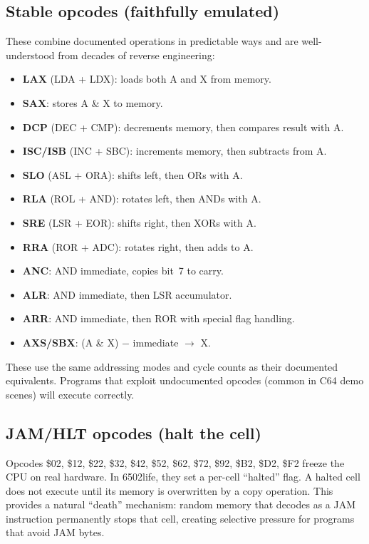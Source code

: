 \documentclass{article}
\begin{document}
\subsection{Stable opcodes (faithfully emulated)}
These combine documented operations in predictable ways and are well-understood
from decades of reverse engineering:
\begin{itemize}
\item \textbf{LAX} (LDA + LDX): loads both A and X from memory.
\item \textbf{SAX}: stores A \& X to memory.
\item \textbf{DCP} (DEC + CMP): decrements memory, then compares result with A.
\item \textbf{ISC/ISB} (INC + SBC): increments memory, then subtracts from A.
\item \textbf{SLO} (ASL + ORA): shifts left, then ORs with A.
\item \textbf{RLA} (ROL + AND): rotates left, then ANDs with A.
\item \textbf{SRE} (LSR + EOR): shifts right, then XORs with A.
\item \textbf{RRA} (ROR + ADC): rotates right, then adds to A.
\item \textbf{ANC}: AND immediate, copies bit~7 to carry.
\item \textbf{ALR}: AND immediate, then LSR accumulator.
\item \textbf{ARR}: AND immediate, then ROR with special flag handling.
\item \textbf{AXS/SBX}: (A \& X) $-$ immediate $\to$ X.
\end{itemize}

These use the same addressing modes and cycle counts as their documented
equivalents. Programs that exploit undocumented opcodes (common in C64
demo scenes) will execute correctly.

\subsection{JAM/HLT opcodes (halt the cell)}
Opcodes \$02, \$12, \$22, \$32, \$42, \$52, \$62, \$72, \$92, \$B2, \$D2, \$F2
freeze the CPU on real hardware. In 6502life, they set a per-cell ``halted''
flag. A halted cell does not execute until its memory is overwritten by a
copy operation. This provides a natural ``death'' mechanism: random memory
that decodes as a JAM instruction permanently stops that cell, creating
selective pressure for programs that avoid JAM bytes.
\end{document}
